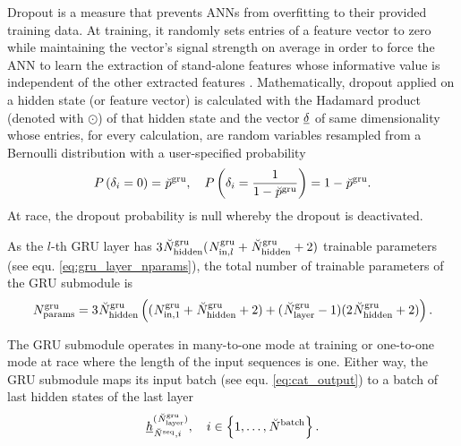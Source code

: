 Dropout is a measure that prevents ANNs from overfitting 
to their provided training data.
At training, 
it randomly sets entries of a feature vector to zero 
while maintaining the vector's signal strength on average
in order to force the ANN to learn the extraction of stand-alone features 
whose informative value is independent of the other extracted features \cite{Hinton2012}.
Mathematically, dropout applied on a hidden state (or feature vector)
is calculated with the Hadamard product (denoted with $\odot$)
of that hidden state and the vector $\GRUDropout$ of same dimensionality 
whose entries, for every calculation, 
are random variables resampled 
from a Bernoulli distribution
with a user-specified probability
\begin{equation}
    P \left( \delta_i = 0 \right) = \GRUDropoutP
    ,\quad
    P \left( \delta_i = \frac{1}{1-\GRUDropoutP} \right) = 1 - \GRUDropoutP
    .
\end{equation}
At race, the dropout probability is null
whereby the dropout is deactivated.

As the $l$-th GRU layer has $3\GRUHiddenSize (\GRUInp{l} + \GRUHiddenSize + 2)$
trainable parameters (see equ. \ref{eq:gru_layer_nparams}),
the total number of trainable parameters of the GRU submodule is
\begin{align} \label{eq:gru_param}
    \GRUNumP = 3\GRUHiddenSize \tuple{
        (\GRUInp{1} + \GRUHiddenSize + 2)
        + 
        (\GRUNumLayer -1)
        (2\GRUHiddenSize + 2)
    }.
\end{align}

The GRU submodule operates in many-to-one mode at training or 
one-to-one mode at race where the length of the input sequences is one.
Either way, the GRU submodule maps its input batch
(see equ. \ref{eq:cat_output})
to a batch of last hidden states of the last layer
\begin{equation}
    \hiddenstate[]{(\GRUNumLayer)}{\seqLen, i}{}{}
    , \quad i \in \setOfInts{1, \dots, \batchSize}
    .
\end{equation}




\newcommand{\normDesSpeed}{\speed[\norm]{\drone}{\desired}{}{}}
\newcommand{\waypIRS}{\pos[]{\wayp}{}{\irs}{}}
\newcommand{\headNavDec}{(\normDesSpeed, \waypIRS)}

\newcommand{\desAngVel}{\angvel[]{\drone}{\desired}{\lrs}{}}
\newcommand{\desAngAcc}{\angvel[\dot]{\drone}{\desired}{\lrs}{}}
\newcommand{\desColThrust}{\anything[]{\drone}{\desired}{}{}{c}}
\newcommand{\headCtrlCmd}{(\desAngVel, \desAngAcc, \desColThrust)}

